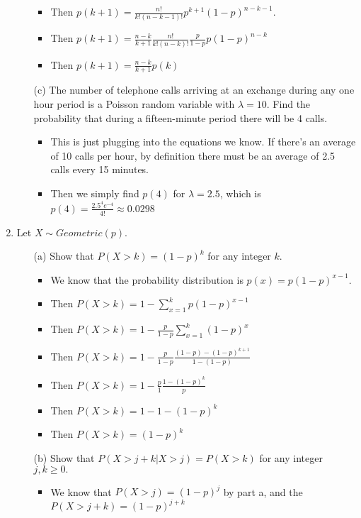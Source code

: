\documentclass{article}
\begin{document}
\begin{enumerate}
\begin{itemize}
\begin{itemize}
        \item Then $p(k+1) = \frac{n!}{k!(n-k-1)!} p^{k+1} (1 - p)^{n-k-1}$.
        \item Then $p(k+1) = \frac{n-k}{k+1} \frac{n!}{k!(n-k)!} \frac{p}{1-p} p(1-p)^{n-k}$
        \item Then $p(k+1) = \frac{n-k}{k+1} p(k)$
        \end{itemize}
    \item [(c)] The number of telephone calls arriving at an exchange during any one hour period is a Poisson random variable with $\lambda=10$. Find the probability that during a fifteen-minute period there will be 4 calls.
        \begin{itemize}
        \item This is just plugging into the equations we know. If there's an average of 10 calls per hour, by definition there must be an average of 2.5 calls every 15 minutes.
        \item Then we simply find $p(4)$ for $\lambda = 2.5$, which is $p(4) = \frac{2.5^4 e^{-4}}{4!} \approx 0.0298 $
        \end{itemize}
    \end{itemize}
\item Let $X \sim Geometric(p)$.
    \begin{enumerate}
    \item [(a)] Show that $P(X>k)=(1-p)^k$ for any integer $k$.
        \begin{itemize}
        \item We know that the probability distribution is $p(x) = p(1 - p)^{x-1}$.
        \item Then $P(X > k) = 1 - \sum_{x=1}^k p(1 - p)^{x - 1}$
        \item Then $P(X > k) = 1 - \frac{p}{1 - p} \sum_{x=1}^k (1 - p)^x$
        \item Then $P(X > k) = 1 - \frac{p}{1 - p} \frac{(1 - p) - (1 - p)^{k + 1}}{1 - (1 - p)}$
        \item Then $P(X > k) = 1 - \frac{p}{1} \frac{1 - (1 - p)^k}{p}$
        \item Then $P(X > k) = 1 - 1 - (1 - p)^k$
        \item Then $P(X > k) = (1 - p)^k$
        \end{itemize}
    \item [(b)] Show that  $P(X> j+k|X > j)=P(X > k)$ for any integer $j,k\ge 0.$
        \begin{itemize}
        \item We know that $P(X > j) = (1 - p)^j$ by part a, and the $P(X > j + k) = (1 - p)^{j + k}$

\end{itemize}
\end{enumerate}
\end{enumerate}
\end{document}
